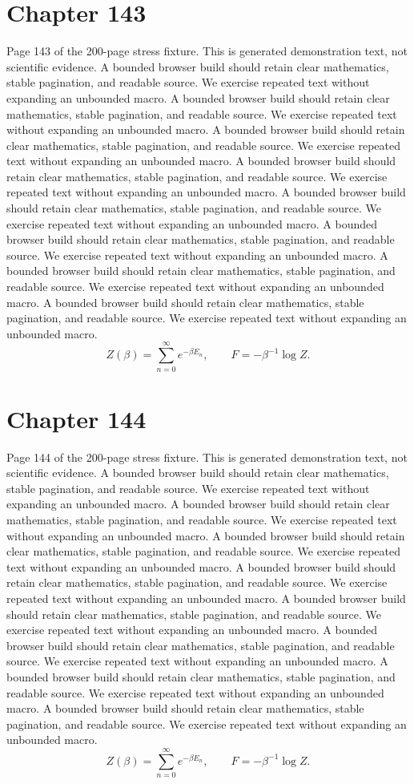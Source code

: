 \documentclass[11pt]{article}
\begin{document}
\section*{Chapter 143}
Page 143 of the 200-page stress fixture. This is generated demonstration text, not scientific evidence.
A bounded browser build should retain clear mathematics, stable pagination, and readable source. We exercise repeated text without expanding an unbounded macro.
A bounded browser build should retain clear mathematics, stable pagination, and readable source. We exercise repeated text without expanding an unbounded macro.
A bounded browser build should retain clear mathematics, stable pagination, and readable source. We exercise repeated text without expanding an unbounded macro.
A bounded browser build should retain clear mathematics, stable pagination, and readable source. We exercise repeated text without expanding an unbounded macro.
A bounded browser build should retain clear mathematics, stable pagination, and readable source. We exercise repeated text without expanding an unbounded macro.
A bounded browser build should retain clear mathematics, stable pagination, and readable source. We exercise repeated text without expanding an unbounded macro.
A bounded browser build should retain clear mathematics, stable pagination, and readable source. We exercise repeated text without expanding an unbounded macro.
A bounded browser build should retain clear mathematics, stable pagination, and readable source. We exercise repeated text without expanding an unbounded macro.
\[Z(\beta)=\sum_{n=0}^{\infty}e^{-\beta E_n},\qquad F=-\beta^{-1}\log Z.\]
\newpage
\section*{Chapter 144}
Page 144 of the 200-page stress fixture. This is generated demonstration text, not scientific evidence.
A bounded browser build should retain clear mathematics, stable pagination, and readable source. We exercise repeated text without expanding an unbounded macro.
A bounded browser build should retain clear mathematics, stable pagination, and readable source. We exercise repeated text without expanding an unbounded macro.
A bounded browser build should retain clear mathematics, stable pagination, and readable source. We exercise repeated text without expanding an unbounded macro.
A bounded browser build should retain clear mathematics, stable pagination, and readable source. We exercise repeated text without expanding an unbounded macro.
A bounded browser build should retain clear mathematics, stable pagination, and readable source. We exercise repeated text without expanding an unbounded macro.
A bounded browser build should retain clear mathematics, stable pagination, and readable source. We exercise repeated text without expanding an unbounded macro.
A bounded browser build should retain clear mathematics, stable pagination, and readable source. We exercise repeated text without expanding an unbounded macro.
A bounded browser build should retain clear mathematics, stable pagination, and readable source. We exercise repeated text without expanding an unbounded macro.
\[Z(\beta)=\sum_{n=0}^{\infty}e^{-\beta E_n},\qquad F=-\beta^{-1}\log Z.\]
\newpage
\end{document}
